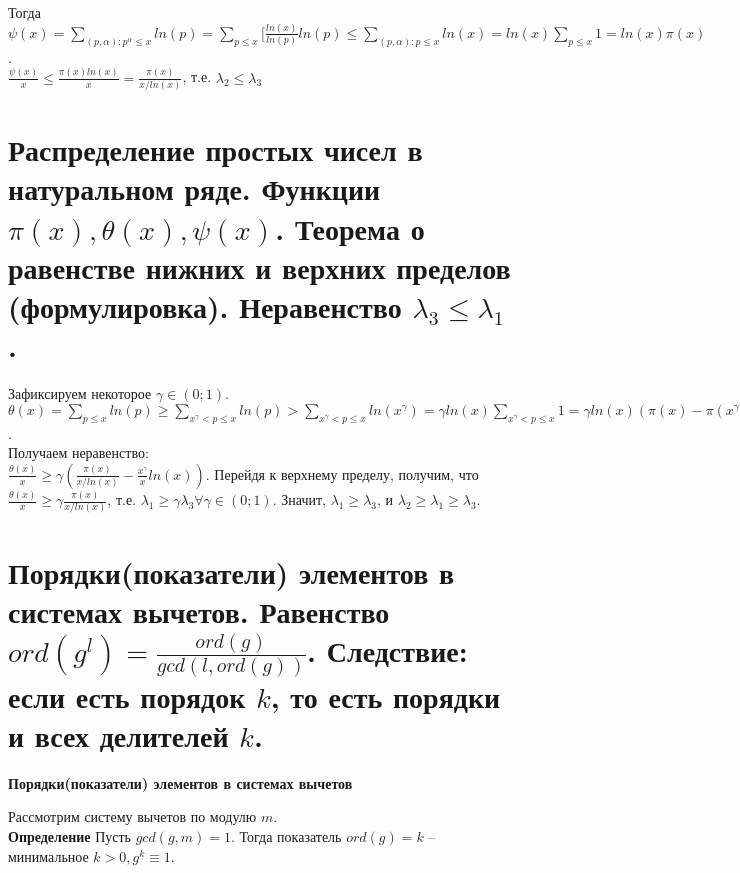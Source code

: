 Тогда $\psi(x) = \displaystyle\sum_{(p, \alpha) : p^{\alpha} \leq x}ln(p) = \displaystyle\sum_{p \leq x}[\frac{ln(x)}{ln(p)}ln(p) \leq \displaystyle\sum_{(p, \alpha) : p \leq x}ln(x) = ln(x)\displaystyle\sum_{p \leq x}1 = ln(x)\pi(x)$.\\

$\frac{\psi(x)}{x} \leq \frac{\pi(x)ln(x)}{x} = \frac{\pi(x)}{x/ln(x)}$, т.е. $\lambda_2 \leq \lambda_3$\\


\section{Распределение простых чисел в натуральном ряде. Функции $\pi(x), \theta(x), \psi(x)$. Теорема о равенстве
нижних и верхних пределов (формулировка). Неравенство $\lambda_3 \leq \lambda_1$.}

Зафиксируем некоторое $\gamma \in (0;1)$.\\

$\theta(x) = \displaystyle\sum_{p \leq x}ln(p) \geq \displaystyle\sum_{x^\gamma < p \leq x}ln(p) > \displaystyle\sum_{x^{\gamma} < p \leq x}ln(x^{\gamma}) = \gamma ln(x)\displaystyle\sum_{x^\gamma < p \leq x}1 = \gamma ln(x)(\pi(x) - \pi(x^{\gamma})) \geq \gamma ln(x)(\pi(x) - x^{\gamma})$.\\

Получаем неравенство:\\

$\frac{\theta(x)}{x} \geq \gamma(\frac{\pi(x)}{x/ln(x)} - \frac{x^{\gamma}}{x}ln(x))$. Перейдя к верхнему пределу, получим, что $\frac{\theta(x)}{x} \geq \gamma\frac{\pi(x)}{x/ln(x)}$, т.е. $\lambda_1 \geq \gamma\lambda_3 \forall \gamma \in (0;1)$. Значит, $\lambda_1 \geq \lambda_3$, и $\lambda_2 \geq \lambda_1 \geq \lambda_3$.


\section{Порядки(показатели) элементов в системах вычетов. Равенство $ord(g^l) = \frac{ord(g)}{gcd(l, ord(g))}$. Следствие: если есть порядок $k$, то есть порядки и всех делителей $k$.}

\textbf{Порядки(показатели) элементов в системах вычетов}

Рассмотрим систему вычетов по модулю $m$.\\

\textbf{Определение} Пусть $gcd(g, m) = 1$. Тогда показатель $ord(g) = k$ -- минимальное $k > 0, g^k \equiv 1$.\\

